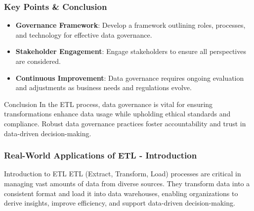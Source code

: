 \documentclass{beamer}
\begin{document}
\begin{frame}[fragile]
    \frametitle{Key Points & Conclusion}
    \begin{itemize}
        \item \textbf{Governance Framework}: Develop a framework outlining roles, processes, and technology for effective data governance.
        \item \textbf{Stakeholder Engagement}: Engage stakeholders to ensure all perspectives are considered.
        \item \textbf{Continuous Improvement}: Data governance requires ongoing evaluation and adjustments as business needs and regulations evolve.
    \end{itemize}

    \begin{block}{Conclusion}
        In the ETL process, data governance is vital for ensuring transformations enhance data usage while upholding ethical standards and compliance. Robust data governance practices foster accountability and trust in data-driven decision-making.
    \end{block}
\end{frame}

\begin{frame}[fragile]
    \frametitle{Real-World Applications of ETL - Introduction}
    \begin{block}{Introduction to ETL}
        ETL (Extract, Transform, Load) processes are critical in managing vast amounts of data from diverse sources. They transform data into a consistent format and load it into data warehouses, enabling organizations to derive insights, improve efficiency, and support data-driven decision-making.
    \end{block}
\end{frame}
\end{document}
